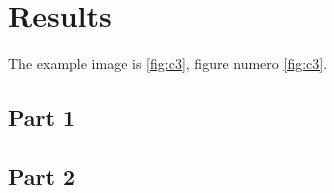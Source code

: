 \section{Results}
\lipsum[1]

\newpage


The example image is \cref{fig:c3}, figure numero \ref{fig:c3}.


\subsection{Part 1}
\lipsum[1]

\subsection{Part 2}
\lipsum[1]
